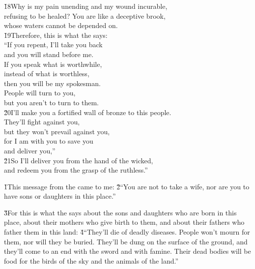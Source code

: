 \begin{poetry}
\poeml \v{18}Why is my pain unending and my wound incurable, \\
\poemll    refusing to be healed?
\poeml You are like a deceptive brook, \\
\poemll    whose waters cannot be depended on. \\
\poeml \v{19}Therefore, this is what the  says: \\
\poemll    ``If you repent, I'll take you back \\
\poemlll       and you will stand before me. \\
\poeml If you speak what is worthwhile, \\
\poemll    instead of what is worthless, \\
\poemlll       then you will be my spokesman. \\
\poeml People will turn to you, \\
\poemll    but you aren't to turn to them. \\
\poeml \v{20}I'll make you a fortified wall of bronze to this people. \\
\poemll    They'll fight against you, \\
\poeml but they won't prevail against you, \\
\poemll    for I am with you to save you \\
\poemlll       and deliver you,'' \\
\poeml \v{21}So I'll deliver you from the hand of the wicked, \\
\poemll    and redeem you from the grasp of the ruthless.''
\end{poetry}

\v{1}This message from the  came to me: \v{2}``You are not to take a wife, nor are you to have sons or daughters in this place.''

\v{3}For this is what the  says about the sons and daughters who are born in this place, about their mothers who give birth to them, and about their fathers who father them in this land: \v{4}``They'll die of deadly diseases. People won't mourn for them, nor will they be buried. They'll be dung on the surface of the ground, and they'll come to an end with the sword and with famine. Their dead bodies will be food for the birds of the sky and the animals of the land.''


